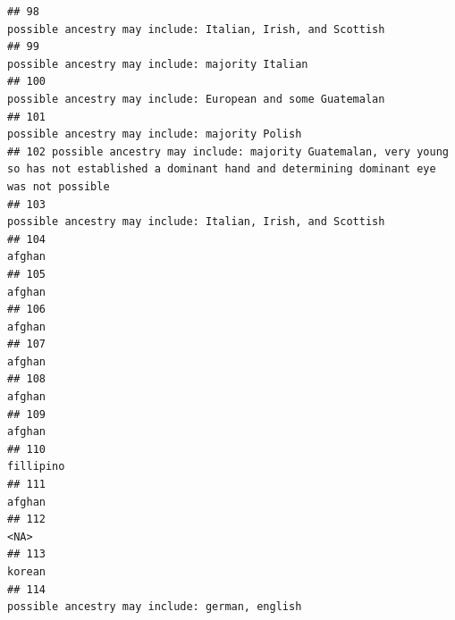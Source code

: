 \documentclass[]{article}
\begin{document}
\begin{verbatim}
## 98                                                                                          possible ancestry may include: Italian, Irish, and Scottish
## 99                                                                                                      possible ancestry may include: majority Italian
## 100                                                                                         possible ancestry may include: European and some Guatemalan
## 101                                                                                                      possible ancestry may include: majority Polish
## 102 possible ancestry may include: majority Guatemalan, very young so has not established a dominant hand and determining dominant eye was not possible
## 103                                                                                         possible ancestry may include: Italian, Irish, and Scottish
## 104                                                                                                                                              afghan
## 105                                                                                                                                              afghan
## 106                                                                                                                                              afghan
## 107                                                                                                                                              afghan
## 108                                                                                                                                              afghan
## 109                                                                                                                                              afghan
## 110                                                                                                                                           fillipino
## 111                                                                                                                                              afghan
## 112                                                                                                                                                <NA>
## 113                                                                                                                                              korean
## 114                                                                                                      possible ancestry may include: german, english

\end{verbatim}
\end{document}
